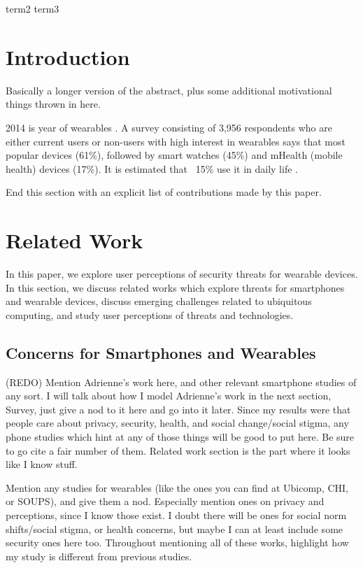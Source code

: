 \documentclass{acm_proc_article-sp}
\begin{document}
 {term2} {term3}



\section{Introduction}
Basically a longer version of the abstract, plus some additional motivational things thrown in here. 

2014 is year of wearables \cite{Forbes}. A survey consisting of 3,956 respondents who are either current users or non-users with high interest in wearables \cite{Neilsen} says that most popular devices (61\%), followed by smart watches (45\%) and mHealth (mobile health) devices (17\%). It is estimated that ~15\% use it in daily life \cite{Nilsen}\cite{WearableStatNews}.

End this section with an explicit list of contributions made by this paper.


\section{Related Work}
In this paper, we explore user perceptions of security threats for wearable devices. In this section, we discuss related works which explore threats for smartphones and wearable devices, discuss emerging challenges related to ubiquitous computing, and study user perceptions of threats and technologies. 

\subsection{Concerns for Smartphones and Wearables}
(REDO) Mention Adrienne's work here, and other relevant smartphone studies of any sort. I will talk about how I model Adrienne's work in the next section, Survey, just give a nod to it here and go into it later. Since my results were that people care about privacy, security, health, and social change/social stigma, any phone studies which hint at any of those things will be good to put here. Be sure to go cite a fair number of them. Related work section is the part where it looks like I know stuff. 

Mention any studies for wearables (like the ones you can find at Ubicomp, CHI, or SOUPS), and give them a nod. Especially mention ones on privacy and perceptions, since I know those exist. I doubt there will be ones for social norm shifts/social stigma, or health concerns, but maybe I can at least include some security ones here too. Throughout mentioning all of these works, highlight how my study is different from previous studies. 
\end{document}
